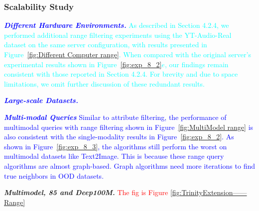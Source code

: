 \documentclass[sigconf, nonacm]{acmart}
\begin{document}
	\subsubsection{Scalability Study}
		
	\textit{\textbf{\textcolor{blue}{Different Hardware Environments.}}}
	\textcolor{cyan}{As described in Section 4.2.4, we performed additional range filtering experiments using the YT-Audio-Real dataset on the same server configuration, with results presented in Figure~\ref{fig:Different Computer range}. When compared with the original server's experimental results shown in Figure~\ref{fig:exp_8_2}$e$, our findings remain consistent with those reported in Section 4.2.4. For brevity and due to space limitations, we omit further discussion of these redundant results.}
	
	\textit{\textbf{\textcolor{blue}{Large-scale Datasets.}}} 
	
	\textit{\textbf{\textcolor{blue}{Multi-modal Queries}}}
	\textcolor{blue}{
	Similar to attribute filtering, the performance of multimodal queries with range filtering shown in Figure~\ref{fig:MultiModel range} is also consistent with the single-modality results in Figure~\ref{fig:exp_8_2}. As shown in Figure~\ref{fig:exp_8_3}, the algorithms still perform the worst on multimodal datasets like Text2Image. This is because these range query algorithms are almost graph-based. Graph algorithms need more iterations to find true neighbors in OOD datasets.}
	
	\textit{\textbf{Multimodel, 85 and Deep100M.}} \textcolor{red}{The fig is Figure \ref{fig:TrinityExtension——Range}}
	
\end{document}
